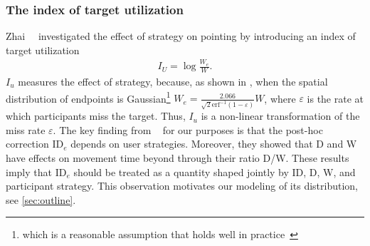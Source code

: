 \documentclass[acmlarge, manuscript,review]{acmart}
\newcommand{\ide}{\ensuremath{{\text{ID}_e}}\xspace}
\begin{document}
\subsubsection{The index of target utilization\label{subs:background::target_util}}
Zhai~\etal~\cite{zhai2004nominal} investigated the effect of strategy on pointing by introducing an index of target utilization
\begin{align}
	I_U = \log \frac{W_e}{W}.
\end{align}
$I_u$ measures the effect of strategy, because, as shown in \cite[Appendix 3]{gori2018tochi}, when the spatial distribution of endpoints is Gaussian\footnote{which is a reasonable assumption that holds well in practice~\cite{soukoreff2004, gori2020}} $W_e = \frac{2.066}{\sqrt{2}\text{erf}^{-1}(1-\varepsilon)} W$, where $\varepsilon$ is the rate at which participants miss the target. Thus, $I_u$ is a non-linear transformation of the miss rate $\varepsilon$. 
The key finding from \citeauthor{zhai2004nominal}~\cite{zhai2004nominal} for our purposes is that the post-hoc correction \ide depends on user strategies. Moreover, they showed that D and W have effects on movement time beyond through their ratio D/W. These results imply that \ide should be treated as a quantity shaped jointly by ID, D, W, and participant strategy. This observation motivates our modeling of its distribution, see \autoref{sec:outline}.
\end{document}
